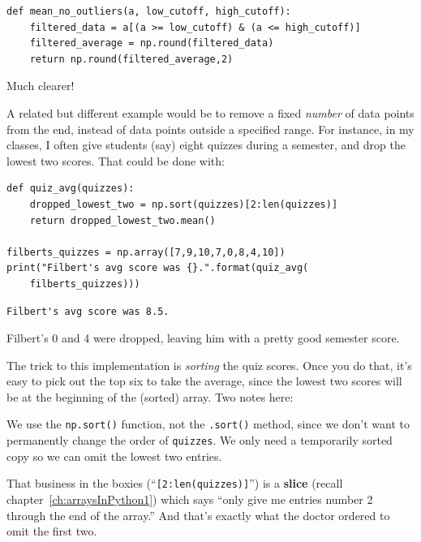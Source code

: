 \begin{Verbatim}[fontsize=\footnotesize,samepage=true,frame=single,framesep=3mm]
def mean_no_outliers(a, low_cutoff, high_cutoff):
    filtered_data = a[(a >= low_cutoff) & (a <= high_cutoff)]
    filtered_average = np.round(filtered_data)
    return np.round(filtered_average,2)
\end{Verbatim}

Much clearer!

\medskip

A related but different example would be to remove a fixed \textit{number} of
data points from the end, instead of data points outside a specified range. For
instance, in my classes, I often give students (say) eight quizzes during a
semester, and drop the lowest two scores. That could be done with:


\begin{Verbatim}[fontsize=\footnotesize,samepage=true,frame=single,framesep=3mm]
def quiz_avg(quizzes):
    dropped_lowest_two = np.sort(quizzes)[2:len(quizzes)]
    return dropped_lowest_two.mean()

filberts_quizzes = np.array([7,9,10,7,0,8,4,10])
print("Filbert's avg score was {}.".format(quiz_avg(
    filberts_quizzes)))
\end{Verbatim}
\vspace{-.2in}

\begin{Verbatim}[fontsize=\small,samepage=true,frame=leftline,framesep=5mm,framerule=1mm]
Filbert's avg score was 8.5.
\end{Verbatim}

Filbert's 0 and 4 were dropped, leaving him with a pretty good semester score.

The trick to this implementation is \textit{sorting} the quiz scores. Once you
do that, it's easy to pick out the top six to take the average, since the
lowest two scores will be at the beginning of the (sorted) array. Two notes
here:


\begin{compactitem}
\item We use the \texttt{np.sort()} function, not the \texttt{.sort()} method,
since we don't want to permanently change the order of \texttt{quizzes}. We
only need a temporarily sorted copy so we can omit the lowest two entries.
\item That business in the boxies (``\texttt{[2:len(quizzes)]}'') is a
\textbf{slice} (recall chapter~\ref{ch:arraysInPython1}) which says ``only give
me entries number 2 through the end of the array.'' And that's exactly what the
doctor ordered to omit the first two.
\end{compactitem}

